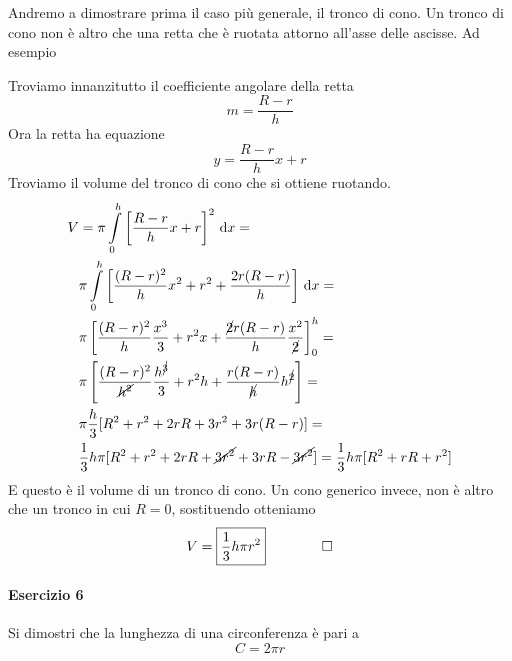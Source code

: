 Andremo a dimostrare prima il caso più generale, il tronco di cono. Un tronco di cono non è altro 
che una retta che è ruotata attorno all'asse delle ascisse. Ad esempio
\begin{center}
\end{center}
Troviamo innanzitutto il coefficiente angolare della retta
\begin{equation*}
  m = \frac{R-r}{h}
\end{equation*}
Ora la retta ha equazione
\begin{equation*}
  y = \frac{R-r}{h}x+r
\end{equation*}
Troviamo il volume del tronco di cono che si ottiene ruotando.
\begin{align*}
  V &= \pi \int\limits_{0}^{h} \left[ \frac{R-r}{h}x+r \right]^2\,\mathop{}\!\mathrm{d} x =\\
  &\pi \int\limits_{0}^{h} \left[ \frac{(R-r)^2}{h}x^2+r^2+\frac{2r(R-r)}{h} \right] \,\mathop{}\!\mathrm{d} x=\\
  &\pi \left[ \frac{(R-r)^2}{h}\frac{x^3}{3}+r^2x+
  \frac{\cancel{2}r(R-r)}{h}\frac{x^2}{\cancel{2}} \right]_0^h=\\
  &\pi \left[ \frac{(R-r)^2}{\cancel{h^2}}\frac{h^{\cancel{3}}}{3}+r^2h+
  \frac{r(R-r)}{\cancel{h}} h^{\cancel{2}} \right]=\\
  &\pi \frac{h}{3} [R^2+r^2+2rR+3r^2+3r(R-r)]=\\
  &\frac{1}{3}h\pi[R^2+r^2+2rR+\cancel{3r^2}+3rR-\cancel{3r^2}]=
  \frac{1}{3}h\pi[R^2+rR+r^2]
\end{align*}
E questo è il volume di un tronco di cono. Un cono generico invece, non è altro che un tronco
in cui $R=0$, sostituendo otteniamo
\begin{equation*}
  V = \boxed{\frac{1}{3}h\pi r^2} \qquad\qed
\end{equation*}

\paragraph{Esercizio 6}
Si dimostri che la lunghezza di una circonferenza è pari a
\begin{equation*}
  C =  2\pi r
\end{equation*}
\divisor

